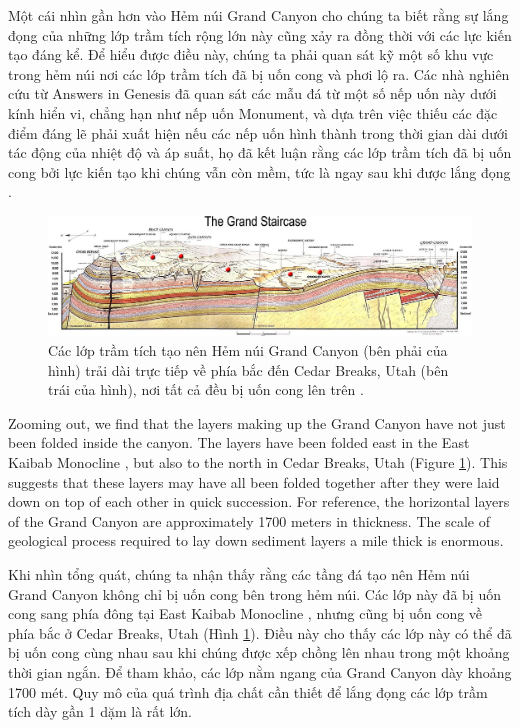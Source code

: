 \documentclass[10pt,twocolumn,letterpaper]{article}
\begin{document}
Một cái nhìn gần hơn vào Hẻm núi Grand Canyon cho chúng ta biết rằng sự lắng đọng của những lớp trầm tích rộng lớn này cũng xảy ra đồng thời với các lực kiến tạo đáng kể. Để hiểu được điều này, chúng ta phải quan sát kỹ một số khu vực trong hẻm núi nơi các lớp trầm tích đã bị uốn cong và phơi lộ ra. Các nhà nghiên cứu từ Answers in Genesis \cite{42} đã quan sát các mẫu đá từ một số nếp uốn này dưới kính hiển vi, chẳng hạn như nếp uốn Monument, và dựa trên việc thiếu các đặc điểm đáng lẽ phải xuất hiện nếu các nếp uốn hình thành trong thời gian dài dưới tác động của nhiệt độ và áp suất, họ đã kết luận rằng các lớp trầm tích đã bị uốn cong bởi lực kiến tạo khi chúng vẫn còn mềm, tức là ngay sau khi được lắng đọng \cite{43}.

\begin{figure}
\begin{center}
\includegraphics[width=1\textwidth]{Grand_Staircase-big.jpg}
\end{center}
   \caption{Các lớp trầm tích tạo nên Hẻm núi Grand Canyon (bên phải của hình) trải dài trực tiếp về phía bắc đến Cedar Breaks, Utah (bên trái của hình), nơi tất cả đều bị uốn cong lên trên \cite{50}.}
\label{fig:4}
\end{figure}
Zooming out, we find that the layers making up the Grand Canyon have not just been folded inside the canyon. The layers have been folded east in the East Kaibab Monocline \cite{46}, but also to the north in Cedar Breaks, Utah (Figure \ref{fig:4}). This suggests that these layers may have all been folded together after they were laid down on top of each other in quick succession. For reference, the horizontal layers of the Grand Canyon are approximately 1700 meters in thickness. The scale of geological process required to lay down sediment layers a mile thick is enormous.

Khi nhìn tổng quát, chúng ta nhận thấy rằng các tầng đá tạo nên Hẻm núi Grand Canyon không chỉ bị uốn cong bên trong hẻm núi. Các lớp này đã bị uốn cong sang phía đông tại East Kaibab Monocline \cite{46}, nhưng cũng bị uốn cong về phía bắc ở Cedar Breaks, Utah (Hình \ref{fig:4}). Điều này cho thấy các lớp này có thể đã bị uốn cong cùng nhau sau khi chúng được xếp chồng lên nhau trong một khoảng thời gian ngắn. Để tham khảo, các lớp nằm ngang của Grand Canyon dày khoảng 1700 mét. Quy mô của quá trình địa chất cần thiết để lắng đọng các lớp trầm tích dày gần 1 dặm là rất lớn.
\end{document}
